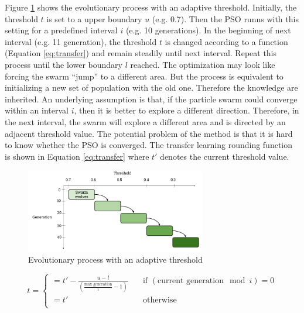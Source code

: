 Figure \ref{fig:adaptive} shows the evolutionary process with an adaptive threshold.
Initially, the threshold $t$ is set to a upper boundary $u$ (e.g. 0.7). Then the PSO runns with this setting for a 
predefined interval $i$ (e.g. 10 generations). In the beginning of next interval (e.g. 11 generation), the threshold $t$ is changed according to
a function (Equation \ref{eq:transfer}) and remain steadily until next interval. 
Repeat this process until the lower boundary $l$ reached. 
The optimization may look like forcing the swarm ``jump'' to a different area. But the process is equivalent to initializing a new set of population with 
the old one. Therefore the knowledge are inherited.
An underlying assumption
is that, if the particle swarm could converge within an interval $i$, then it is better to explore a different direction.
Therefore, in the next interval, the swarm will explore a different area and is directed by an adjacent threshold value. 
The potential problem of the method is that it is hard to know whether the PSO is converged.
The transfer learning rounding function is shown in Equation \ref{eq:transfer} where $t'$ denotes the current threshold value.
\begin{figure}[H]
 \centering
   \includegraphics[width=0.7\textwidth]{pics/transfer.png}
   \caption{Evolutionary process with an adaptive threshold}
   \label{fig:adaptive}
 \end{figure}
 
\begin{equation}
\label{eq:transfer}
		t = 
		\begin{cases}
		= t' - \frac{u - l}{(\frac{\text{max generation}}{i} - 1)} & \quad \text{if } (\text{current generation}\mod i) = 0\\
		= t' & \quad \text{otherwise} \\
		\end{cases}
\end{equation}


